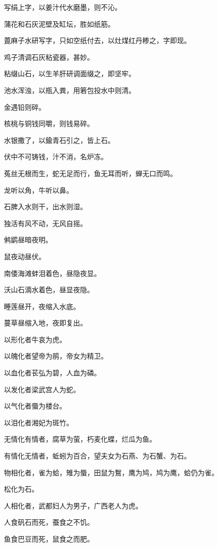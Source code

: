 \documentclass[a4paper,12pt,UTF8,twoside]{ctexbook}
\begin{document}
    写绢上字，以姜汁代水磨墨，则不沁。
    
    蒲花和石灰泥壁及缸坛，胜如纸筋。
    
    蓖麻子水研写字，只如空纸付去，以灶煤红丹糁之，字即现。
    
    鸡子清调石灰粘瓷器，甚妙。
    
    粘缀山石，以生羊肝研调面缀之，即坚牢。
    
    池水浑浊，以瓶入粪，用箬包投水中则清。
    
    金遇铅则碎。
    
    核桃与铜钱同嚼，则钱易碎。
    
    水银撒了，以鍮青石引之，皆上石。
    
    伏中不可铸钱，汁不消，名炉冻。
    
    菟丝无根而生，蛇无足而行，鱼无耳而听，蝉无口而鸣。
    
    龙听以角，牛听以鼻。
    
    石脾入水则干，出水则湿。
    
    独活有风不动，无风自摇。
    
    鸺鹠昼暗夜明。
    
    鼠夜动昼伏。
    
    南倭海滩蚌泪着色，昼隐夜显。
    
    沃山石滴水着色，昼显夜隐。
    
    睡莲昼开，夜缩入水底。
    
    蔓草昼缩入地，夜即复出。
    
    以形化者牛哀为虎。
    
    以魄化者望帝为鹃，帝女为精卫。
    
    以血化者苌弘为碧，人血为磷。
    
    以发化者梁武宫人为蛇。
    
    以气化者蜃为楼台。
    
    以泪化者湘妃为斑竹。
    
    无情化有情者，腐草为萤，朽麦化蝶，烂瓜为鱼。
    
    有情化无情者，蚯蚓为百合，望夫女为石燕、为石蟹、为石。
    
    物相化者，雀为蛤，雉为蜃，田鼠为鴽，鹰为鸠，鸠为鹰，蛤仍为雀。
    
    松化为石。
    
    人相化者，武都妇人为男子，广西老人为虎。
    
    人食矾石而死，蚕食之不饥。
    
    鱼食巴豆而死，鼠食之而肥。
    
\end{document}
